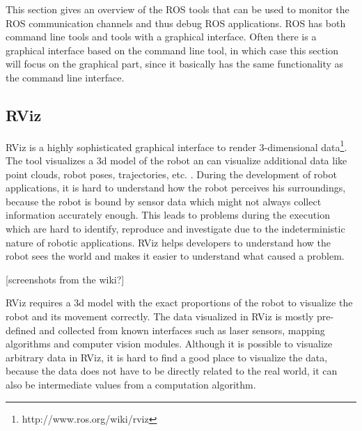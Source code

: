 This section gives an overview of the ROS tools that can be used to monitor the ROS communication channels and thus debug ROS applications. ROS has both command line tools and tools with a graphical interface. Often there is a graphical interface based on the command line tool, in which case this section will focus on the graphical part, since it basically has the same functionality as the command line interface.


\subsection{RViz}
RViz is a highly sophisticated graphical interface to render 3-dimensional data\footnote{http://www.ros.org/wiki/rviz}. The tool visualizes a 3d model of the robot an can visualize additional data like point clouds, robot poses, trajectories, etc. \cite{Quigley2009}. During the development of robot applications, it is hard to understand how the robot perceives his surroundings, because the robot is bound by sensor data which might not always collect information accurately enough. This leads to problems during the execution which are hard to identify, reproduce and investigate due to the indeterministic nature of robotic applications. RViz helps developers to understand how the robot sees the world and makes it easier to understand what caused a problem.

[screenshots from the wiki?]

RViz requires a 3d model with the exact proportions of the robot to visualize the robot and its movement correctly. The data visualized in RViz is mostly pre-defined and collected from known interfaces such as laser sensors, mapping algorithms and computer vision modules. Although it is possible to visualize arbitrary data in RViz, it is hard to find a good place to visualize the data, because the data does not have to be directly related to the real world, it can also be intermediate values from a computation algorithm.

